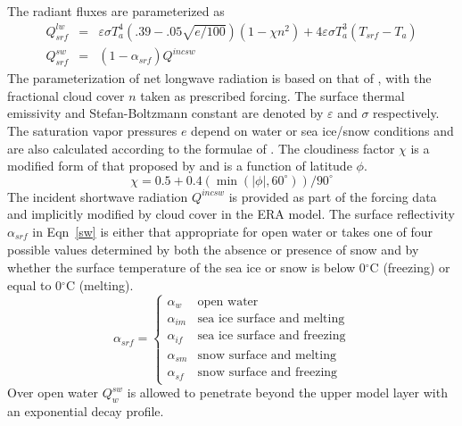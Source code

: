 The radiant fluxes are parameterized as 
\begin{eqnarray}
%
%
\label{lw} Q_{\mathit{srf}}^{\mathit{lw}}              &=&
\varepsilon \sigma T_{a}^{4} (.39-.05 \sqrt{e/100})(1-{\chi}n^2)
+ 4\varepsilon \sigma T_a^3(T_{\mathit{srf}} - T_a)         \\
%
%
\label{sw}  Q_{\mathit{srf}}^{\mathit{sw}}             &=&
 (1-\alpha_{\mathit{srf}})Q^{\mathit{incsw}}
%
\end{eqnarray}
The parameterization of net longwave radiation is based on that of \citet{berliand52},
with the fractional cloud cover $n$ taken as prescribed forcing.
The surface thermal emissivity and Stefan-Boltzmann constant are denoted by
$\varepsilon$ and $\sigma$ respectively.
The saturation vapor pressures $e$ depend on water or sea ice/snow conditions and are also calculated
according to the formulae of \citet{buck81}.
The cloudiness factor $\chi$ is a modified form of that proposed by \citet{budyko74} and is a function
of latitude $\phi$.
\begin{equation}
\chi = 0.5 + 0.4 ( \min (|\phi|,60^{\circ}) )/90^{\circ}
\end{equation}
The incident shortwave radiation $Q^{\mathit{incsw}}$ is 
provided as part of the forcing data and implicitly modified 
by cloud cover in the ERA model.
The surface reflectivity $\alpha_{\mathit{srf}}$ in Eqn~\ref{sw}
is either that appropriate for open water or
takes one of four possible values determined by both the
absence or presence of snow
and by whether the surface temperature
of the sea ice or snow is below 0$^{\circ}$C (freezing)
or equal to 0$^{\circ}$C (melting).
\begin{equation}
\label{eqn:albedo}
\alpha_{\mathit{srf}} = \left\{ \begin{array}{cc}
\alpha_{\mathit{w}}  & \mbox{open water} \\
\alpha_{\mathit{im}} & \mbox{sea ice surface and melting} \\
\alpha_{\mathit{if}} & \mbox{sea ice surface and freezing} \\
\alpha_{\mathit{sm}} & \mbox{snow surface and melting} \\
\alpha_{\mathit{sf}} & \mbox{snow surface and freezing}
                                \end{array}
                         \right.
\end{equation}
Over open water $Q_{\mathit{w}}^{\mathit{sw}}$ is allowed to penetrate
beyond the upper model layer with an exponential decay profile.

